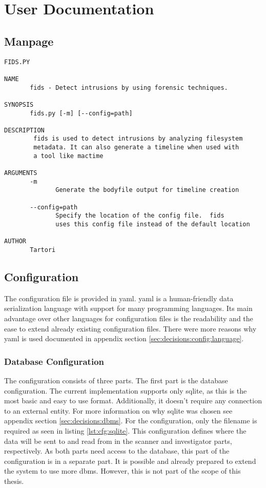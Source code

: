 \chapter{User Documentation}
\label{sec:userdocu}

\section{Manpage}

\begin{lstlisting}
FIDS.PY

NAME
       fids - Detect intrusions by using forensic techniques.

SYNOPSIS
       fids.py [-m] [--config=path]

DESCRIPTION
        fids is used to detect intrusions by analyzing filesystem
        metadata. It can also generate a timeline when used with 
        a tool like mactime

ARGUMENTS
       -m
              Generate the bodyfile output for timeline creation

       --config=path
              Specify the location of the config file.  fids
              uses this config file instead of the default location

AUTHOR
       Tartori

\end{lstlisting}

\section{Configuration}
\label{sec:userdocu:Configuration}

The configuration file is provided in \gls{yaml}. \gls{yaml} is a human-friendly data serialization language with support for many programming languages. Its main advantage over other languages for configuration files is the readability and the ease to extend already existing configuration files. There were more reasons why \gls{yaml} is used documented in appendix section \ref{sec:decisions:config:language}.

\subsection{Database Configuration}

The configuration consists of three parts. The first part is the database configuration. The current implementation supports only \gls{sqlite}, as this is the most basic and easy to use format. Additionally, it doesn't require any connection to an external entity. For more information on why \gls{sqlite} was chosen see appendix section \ref{sec:decisions:dbms}. For the configuration, only the filename is required as seen in listing \ref{lst:cfg:sqlite}. This configuration defines where the data will be sent to and read from in the scanner and investigator parts, respectively. As both parts need access to the database, this part of the configuration is in a separate part. It is possible and already prepared to extend the system to use more \gls{dbms}. However, this is not part of the scope of this thesis.


